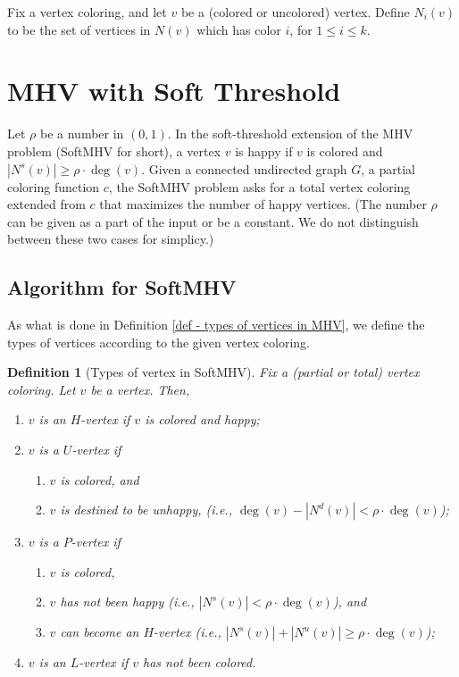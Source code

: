 \documentclass[11pt]{article}
\newtheorem{definition}{Definition}[section]
\begin{document}
Fix a vertex coloring, and let $v$ be a (colored or uncolored) vertex.
Define $N_i(v)$ to be the set of vertices in $N(v)$ which has color $i$,
for $1 \leq i \leq k$.




\section{MHV with Soft Threshold}
Let $\rho$ be a number in $(0, 1)$. In the soft-threshold extension of
the MHV problem (SoftMHV for short), a vertex $v$ is happy if $v$ is
colored and $|N^s(v)| \geq \rho \cdot \deg(v)$.
Given a connected undirected graph $G$, a partial coloring function $c$,
the SoftMHV problem asks for a total vertex coloring extended from $c$ that
maximizes the number of happy vertices.
(The number $\rho$ can be given as a part of the input or be a constant.
We do not distinguish between these two cases for simplicy.)




\subsection{Algorithm for SoftMHV}
As what is done in Definition \ref{def - types of vertices in MHV},
we define the types of vertices according to the given vertex coloring.

\begin{definition}[Types of vertex in SoftMHV]
\label{def - types of vertex - SoftMHV}
Fix a (partial or total) vertex coloring. Let $v$ be a vertex. Then,
\begin{enumerate}
\item $v$ is an $H$-vertex if $v$ is colored and happy;

\item $v$ is a $U$-vertex if
\begin{enumerate}
\item $v$ is colored, and
\item $v$ is destined to be unhappy, (i.e., $\deg(v) - |N^d(v)| < \rho \cdot \deg(v)$);
\end{enumerate}

\item $v$ is a $P$-vertex if
\begin{enumerate}
\item $v$ is colored,
\item $v$ has not been happy (i.e., $|N^s(v)| < \rho \cdot \deg(v)$), and
\item $v$ can become an $H$-vertex (i.e., $|N^s(v)| + |N^u(v)| \geq \rho \cdot \deg(v)$);
\end{enumerate}

\item $v$ is an $L$-vertex if $v$ has not been colored.
\end{enumerate}
\end{definition}
\end{document}
